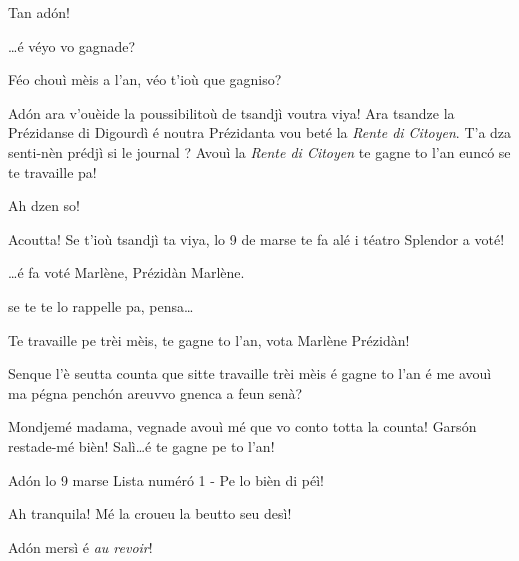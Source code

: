 \begin{drama}
\Joellespeaks Tan ad\'on!

\Dallasspeaks \ldots é véyo vo gagnade?

\Jeanspeaks Féo chouì mèis a l'an, véo t'ioù que gagniso?

\Dallasspeaks Ad\'on ara v'ouèide la poussibilitoù de tsandjì voutra viya! Ara tsandze la Prézidanse di Digourdì é noutra Prézidanta vou beté la \textit{Rente di Citoyen}. T'a dza senti-nèn prédjì si le journal \journal ? Avouì la \textit{Rente di Citoyen} te gagne to l'an eunc\'o se te travaille pa!

\Jeanspeaks Ah dzen so!

\Dallasspeaks Acoutta! Se t'ioù tsandjì ta viya, lo 9 de marse te fa alé i téatro Splendor a voté!
 
\Joellespeaks \ldots é fa voté Marlène, Prézidàn Marlène.

\Dallasspeaks {} se te te lo rappelle pa, pensa\ldots
 
\Joelledallasspeaks {} \og Te travaille pe trèi mèis, te gagne to l'an, vota Marlène Prézidàn\fg!



\Saventaspeaks Senque l'è seutta counta que sitte travaille trèi mèis é gagne to l’an é me avouì ma pégna pench\'on areuvvo gnenca a feun senà?

\Dallasspeaks Mondjemé madama, vegnade avouì mé que vo conto totta la counta!  Gars\'on restade-mé bièn! Salì\ldots é te gagne pe to l'an!



\Joellespeaks Ad\'on lo 9 marse Lista num\'er\'o 1 - Pe lo bièn di péì!

\Jeanspeaks Ah tranquila!  Mé la croueu la beutto seu desì! 

\Joellespeaks Ad\'on mersì é \textit{au revoir}!




\end{drama}
